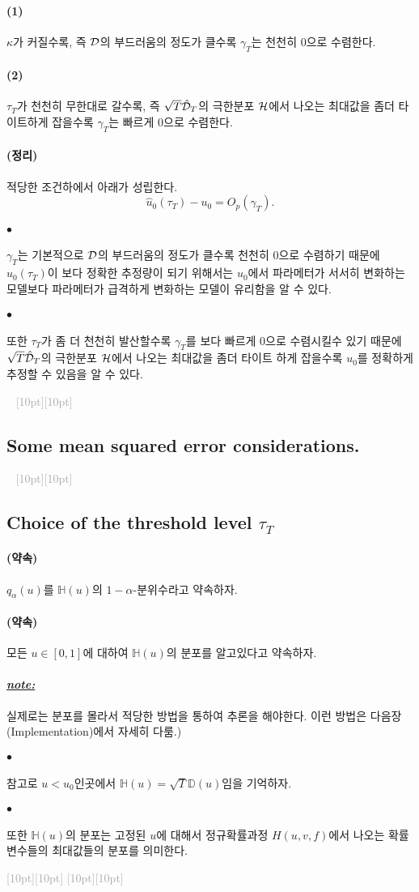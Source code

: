 \documentclass[12pt,oneside,english]{book}
\newcommand{\dash}{\vspace{2em}\noindent \textcolor{darkgray}{\hrulefill~ \raisebox{-2.5pt}[10pt][10pt]{\leafright \decofourleft \decothreeleft  \aldineright \decotwo \floweroneleft \decoone   \floweroneright \decotwo \aldineleft\decothreeright \decofourright \leafleft} ~  \hrulefill \\ \vspace{2em}}}
\newcommand{\rdash}{\noindent \textcolor{darkgray}{ \raisebox{-1.9pt}[10pt][10pt]{\leafright} \hrulefill \raisebox{-1.9pt}[10pt][10pt]{\leafright \decofourleft \decothreeleft  \aldineright \decotwo \floweroneleft \decoone}}}
\def\ck{\paragraph{\Large$\bullet$}\Large}
\def\thm{\paragraph{\Large(정리)}\Large}
\def\promise{\paragraph{\Large(약속)}\Large}
\def\note{\paragraph{\Large\textit{\underline{note:}}}\Large}
\def\one{\paragraph{\Large(1)}\Large}
\def\two{\paragraph{\Large(2)}\Large}
\begin{document}
\one $\kappa$가 커질수록, 즉 $\cal D$의 부드러움의 정도가 클수록 $\gamma_T$는 천천히 0으로 수렴한다. 

\two $\tau_T$가 천천히 무한대로 갈수록, 즉 $\sqrt{T}\hat{\cal D}_T$의 극한분포 $\cal H$에서 나오는 최대값을 좀더 타이트하게 잡을수록 $\gamma_T$는 빠르게 0으로 수렴한다. 

\thm 적당한 조건하에서 아래가 성립한다. 
$$\hat{u}_0(\tau_T)-u_0=O_p(\gamma_T).$$

\ck $\gamma_T$는 기본적으로 $\cal D$의 부드러움의 정도가 클수록 천천히 0으로 수렴하기 때문에 $\hat{u}_0(\tau_T)$이 보다 정확한 추정량이 되기 위해서는 $u_0$에서 파라메터가 서서히 변화하는 모델보다 파라메터가 급격하게 변화하는 모델이 유리함을 알 수 있다. 

\ck 또한 $\tau_T$가 좀 더 천천히 발산할수록 $\gamma_T$를 보다 빠르게 0으로 수렴시킬수 있기 때문에 $\sqrt{T}\hat{\cal D}_T$의 극한분포 $\cal H$에서 나오는 최대값을 좀더 타이트 하게 잡을수록 $u_0$를 정확하게 추정할 수 있음을 알 수 있다. 

\dash 
\subsection{Some mean squared error considerations.}


\dash 

\subsection{Choice of the threshold level $\tau_T$}


\promise $q_{\alpha}(u)$를 $\mathbb{H}(u)$의 $1-\alpha$-분위수라고 약속하자. 

\promise 모든 $u\in [0,1]$에 대하여 $\mathbb{H}(u)$의 분포를 알고있다고 약속하자. 

\note 실제로는 분포를 몰라서 적당한 방법을 통하여 추론을 해야한다. 이런 방법은 다음장(Implementation)에서 자세히 다룸.)

\ck 참고로 $u<u_0$인곳에서 $\mathbb{H}(u)=\sqrt{T}\mathbb{D}(u)$임을 기억하자. 
\ck 또한 $\mathbb{H}(u)$의 분포는 고정된 $u$에 대해서 정규확률과정 $H(u,v,f)$에서 나오는 확률변수들의 최대값들의 분포를 의미한다. 

\rdash 
\end{document}
